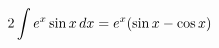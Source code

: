 \documentclass[preview]{standalone}
\begin{document}
\begin{align*}
\special{dvisvgm:raw <g id='unique000'>}2\int e^x \sin x \, dx = e^x(\sin x - \cos x)\special{dvisvgm:raw </g>}
\end{align*}
\end{document}
